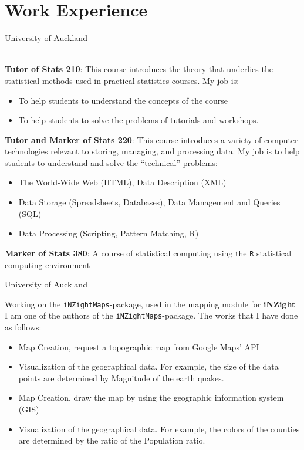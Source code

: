 \documentclass[11pt,a4paper, twoside]{moderncv} %
\begin{document}
\section{Work Experience}
  {University of Auckland}{}{}{
	~\\
	\textbf{Tutor of Stats 210}: This course introduces the theory that underlies the statistical methods used in practical statistics courses. My job is:
		\begin{itemize}
			\item To help students to understand the concepts of the course
			\item To help students to solve the problems of tutorials and workshops. \\
		\end{itemize}	
	\textbf{Tutor and Marker of Stats 220}: This course introduces a variety of computer technologies relevant to storing, managing, and processing data. My job is to help students to understand and solve the ``technical'' problems:
		\begin{itemize}
			\item The World-Wide Web (HTML), Data Description (XML)
			\item Data Storage (Spreadsheets, Databases), Data Management and Queries (SQL)
			\item Data Processing (Scripting, Pattern Matching, R) \\
		\end{itemize}
	\textbf{Marker of Stats 380}: A course of statistical computing using the \texttt{R} statistical computing environment\\}

  {University of Auckland}{}{}{
	Working on the \texttt{iNZightMaps}-package, used in the mapping module for \textbf{iNZight} I am one of the authors of the \texttt{iNZightMaps}-package. The works that I have done as follows:
	\begin{itemize}
		\item Map Creation, request a topographic map from Google Maps' API
		\item Visualization of the geographical data. For example, the size of the data points are determined by Magnitude of the earth quakes.
		\item Map Creation, draw the map by using the geographic information system (GIS)
		\item Visualization of the geographical data. For example, the colors of the counties are determined by the ratio of the Population ratio.
	\end{itemize}
}
\end{document}

